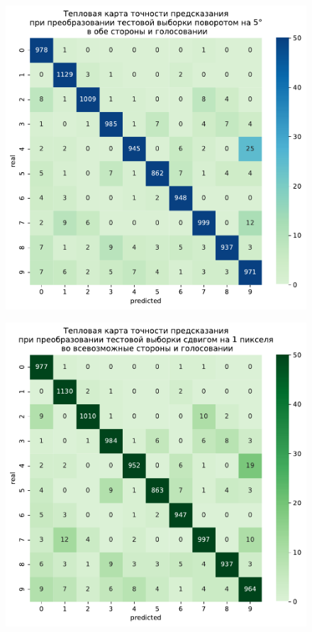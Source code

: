 \documentclass{article}
\begin{document}
\newpage
\begin{figure}[h]	
	\subfigure
	{
	    \begin{minipage}{8cm}
	        \centering
	        \includegraphics[scale=0.35]{TASK1 test 5 + - .pdf}
	    \end{minipage}
	    \label{app6:rot5+-}
	}
	\subfigure
	{
		\begin{minipage}{8cm}
			\centering
			\includegraphics[scale=0.35]{TASK1 test good shift.pdf}

\end{minipage}}
\end{figure}
\end{document}
